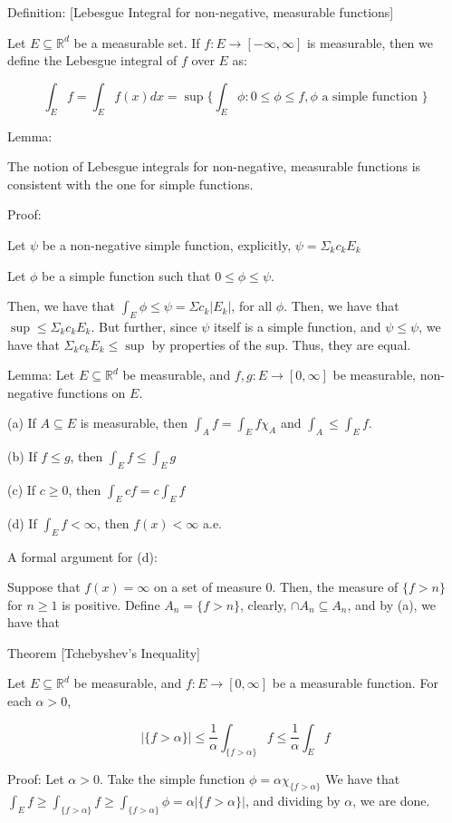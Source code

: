 \documentclass[10pt]{article}
\begin{document}
Definition: [Lebesgue Integral for non-negative, measurable functions]

Let $ E \subseteq \mathbb{R}^d$ be a measurable set. If $f: E \to [-\infty,\infty]$ is measurable, then we define the Lebesgue integral of $f$ over $E$ as:

$$ \int_E f = \int_E f(x) dx = \sup \{ \int_E \phi : 0 \leq \phi \leq f, \phi \text{ a simple function } \}$$

Lemma: 

The notion of Lebesgue integrals for non-negative, measurable functions is consistent with the one for simple functions.

Proof:

Let $\psi$ be a non-negative simple function, explicitly, $\psi = \Sigma_k c_k E_k$

Let $\phi$ be a simple function such that $ 0 \leq \phi \leq \psi$. 

Then, we have that $\int_E \phi \leq \psi  = \Sigma c_k |E_k|$, for all $\phi$. Then, we have that $\sup \leq \Sigma_k c_k E_k$. But further, since $\psi$ itself is a simple function, and $\psi \leq \psi$, we have that $\Sigma_k c_k E_k \leq \sup$ by properties of the sup. Thus, they are equal.

Lemma: Let $E \subseteq \mathbb{R}^d$ be measurable, and $f,g: E \to [0,\infty]$ be measurable, non-negative functions on $E$.

(a) If $A \subseteq E$ is measurable, then $\int_A f = \int_E f \chi_A$ and $\int_A \leq \int_E f$.

(b) If $f \leq g$, then $\int_E f \leq \int_E g$

(c) If $c \geq 0$, then $\int_E cf = c \int_E f$

(d) If $\int_E f < \infty$, then $f(x) < \infty$ a.e.

A formal argument for (d):

Suppose that $f(x) = \infty$ on a set of measure 0. Then, the measure of $\{ f > n \}$ for $n \geq 1$ is positive. Define $A_n = \{ f > n \}$, clearly, $\cap A_n \subseteq A_n$, and by (a), we have that 

Theorem [Tchebyshev’s Inequality]

Let $E \subseteq \mathbb{R}^d$ be measurable, and $f: E \to [0,\infty]$ be a measurable function. For each $\alpha > 0$,

$$ | \{ f >\alpha \} | \leq \frac{1}{\alpha} \int_{\{ f > \alpha \}} f \leq \frac{1}{\alpha} \int_E f$$

Proof: Let $\alpha > 0$. Take the simple function $\phi = \alpha \chi_{\{ f > \alpha \}}$ We have that $\int_E f \geq \int_{\{ f > \alpha \}} f \geq \int_{\{ f > \alpha \}} \phi = \alpha |\{ f > \alpha \}|$, and dividing by $\alpha$, we are done.
\end{document}
